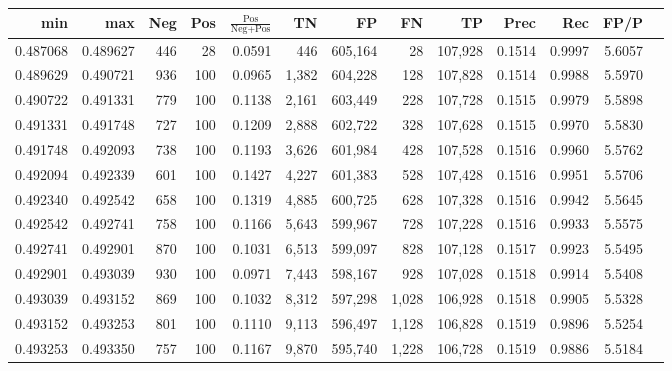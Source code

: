 \begin{tabular}{rrrrrrrrrrrrr}
\toprule
     min &      max &   Neg & Pos & $\frac{\text{Pos}}{\text{Neg}+\text{Pos}}$ &      TN &      FP &      FN &      TP &   Prec &    Rec &   FP/P \\
\midrule
0.487068 & 0.489627 &   446 &  28 &                                     0.0591 &     446 & 605,164 &      28 & 107,928 & 0.1514 & 0.9997 & 5.6057 \\
0.489629 & 0.490721 &   936 & 100 &                                     0.0965 &   1,382 & 604,228 &     128 & 107,828 & 0.1514 & 0.9988 & 5.5970 \\
0.490722 & 0.491331 &   779 & 100 &                                     0.1138 &   2,161 & 603,449 &     228 & 107,728 & 0.1515 & 0.9979 & 5.5898 \\
0.491331 & 0.491748 &   727 & 100 &                                     0.1209 &   2,888 & 602,722 &     328 & 107,628 & 0.1515 & 0.9970 & 5.5830 \\
0.491748 & 0.492093 &   738 & 100 &                                     0.1193 &   3,626 & 601,984 &     428 & 107,528 & 0.1516 & 0.9960 & 5.5762 \\
0.492094 & 0.492339 &   601 & 100 &                                     0.1427 &   4,227 & 601,383 &     528 & 107,428 & 0.1516 & 0.9951 & 5.5706 \\
0.492340 & 0.492542 &   658 & 100 &                                     0.1319 &   4,885 & 600,725 &     628 & 107,328 & 0.1516 & 0.9942 & 5.5645 \\
0.492542 & 0.492741 &   758 & 100 &                                     0.1166 &   5,643 & 599,967 &     728 & 107,228 & 0.1516 & 0.9933 & 5.5575 \\
0.492741 & 0.492901 &   870 & 100 &                                     0.1031 &   6,513 & 599,097 &     828 & 107,128 & 0.1517 & 0.9923 & 5.5495 \\
0.492901 & 0.493039 &   930 & 100 &                                     0.0971 &   7,443 & 598,167 &     928 & 107,028 & 0.1518 & 0.9914 & 5.5408 \\
0.493039 & 0.493152 &   869 & 100 &                                     0.1032 &   8,312 & 597,298 &   1,028 & 106,928 & 0.1518 & 0.9905 & 5.5328 \\
0.493152 & 0.493253 &   801 & 100 &                                     0.1110 &   9,113 & 596,497 &   1,128 & 106,828 & 0.1519 & 0.9896 & 5.5254 \\
0.493253 & 0.493350 &   757 & 100 &                                     0.1167 &   9,870 & 595,740 &   1,228 & 106,728 & 0.1519 & 0.9886 & 5.5184 \\

\end{tabular}
